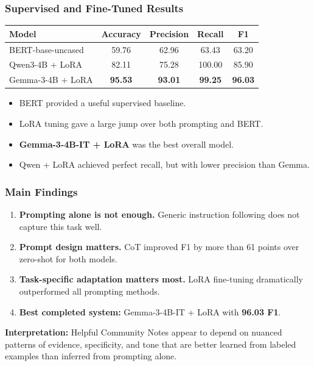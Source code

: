 \documentclass[11pt]{beamer}
\begin{document}
	\begin{frame}
		\frametitle{Supervised and Fine-Tuned Results}
		\begin{table}
			\centering
			\small
			\begin{tabular}{lcccc}
				\toprule
				\textbf{Model} & \textbf{Accuracy} & \textbf{Precision} & \textbf{Recall} & \textbf{F1} \\
				\midrule
				BERT-base-uncased & 59.76 & 62.96 & 63.43 & 63.20 \\
				Qwen3-4B + LoRA & 82.11 & 75.28 & 100.00 & 85.90 \\
				Gemma-3-4B + LoRA & \textbf{95.53} & \textbf{93.01} & \textbf{99.25} & \textbf{96.03} \\
				\bottomrule
			\end{tabular}
		\end{table}
		
		\begin{itemize}
			\item BERT provided a useful supervised baseline.
			\item LoRA tuning gave a large jump over both prompting and BERT.
			\item \textbf{Gemma-3-4B-IT + LoRA} was the best overall model.
			\item Qwen + LoRA achieved perfect recall, but with lower precision than Gemma.
		\end{itemize}
	\end{frame}
	
	\begin{frame}
		\frametitle{Main Findings}
		\begin{enumerate}
			\item \textbf{Prompting alone is not enough.} Generic instruction following does not capture this task well.
			\item \textbf{Prompt design matters.} CoT improved F1 by more than 61 points over zero-shot for both models.
			\item \textbf{Task-specific adaptation matters most.} LoRA fine-tuning dramatically outperformed all prompting methods.
			\item \textbf{Best completed system:} Gemma-3-4B-IT + LoRA with \textbf{96.03 F1}.
		\end{enumerate}
		
		\vspace{0.3cm}
		\textbf{Interpretation:} Helpful Community Notes appear to depend on nuanced patterns of evidence, specificity, and tone that are better learned from labeled examples than inferred from prompting alone.
	\end{frame}
	
\end{document}
